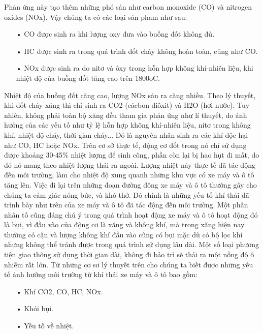 Phản ứng này tạo thêm những phó sản như carbon monoxide (CO) và nitrogen oxides (NOx). Vậy chúng ta có các loại sản pham như sau:
\begin{itemize}
\item[•]CO được sinh ra khi lượng oxy đưa vào buồng đốt không đủ.
\item[•]HC được sinh ra trong quá trình đốt cháy không hoàn toàn, cũng như CO.
\item[•]NOx được sinh ra do nitơ và ôxy trong hỗn hợp không khí-nhiên liệu, khi nhiệt độ của buồng đốt tăng cao trên 1800oC.
\end{itemize}
 Nhiệt độ của buồng đốt càng cao, lượng NOx sản ra càng nhiều.
Theo lý thuyết, khi đốt cháy xăng thì chỉ sinh ra CO2 (cácbon điôxit) và H2O (hơi nước). Tuy nhiên, không phải toàn bộ xăng đều tham gia phản ứng như lí thuyết, do ảnh hưởng của các yếu tố như tỷ lệ hỗn hợp không khí-nhiên liệu, nitơ trong không khí, nhiệt độ cháy, thời gian cháy... Đó là nguyên nhân sinh ra các khí độc hại như CO, HC hoặc NOx.
Trên cơ sở thực tế, động cơ đốt trong nó chỉ sử dụng được khoảng 30-45\% nhiệt lượng để sinh công, phần còn lại bị hao hụt đi mất, do đó nó mang theo nhiệt lượng thải ra ngoài. Lượng nhiệt này thực tế đã tác động đến môi trường, làm cho nhiệt độ xung quanh những khu vực có xe máy và ô tô tăng lên. Việc đi lại trên những đoạn đường đông xe máy và ô tô thường gây cho chúng ta cảm giác nóng bức, và khó thở. Đó chính là những yếu tố khí thải đã trình bày như trên của xe máy và ô tô đã tác động đến môi trường.
Một phần nhân tố cũng đáng chú ý trong quá trình hoạt động xe máy và ô tô hoạt động đó là bụi, vì đầu vào của động cơ là xăng và không khí, mà trong xăng hiện nay thường có cặn và lượng không khí đầu vào cũng có bụi mặc dù có bộ lọc khí nhưng không thể tránh được trong quá trình sử dụng lâu dài. Một số loại phương tiện giao thông sử dụng thời gian dài, không đi bảo trì sẽ thải ra một nồng độ ô nhiễm rất lớn.
Từ những cơ sơ lý thuyết trên cho chúng ta biết được những yếu tố ảnh hưởng môi trường từ khí thải xe máy và ô tô bao gồm:
\begin{itemize}
\item[•]Khí CO2, CO, HC, NOx.
\item[•]Khói bụi.
\item[•]Yếu tố về nhiệt.
\end{itemize}








